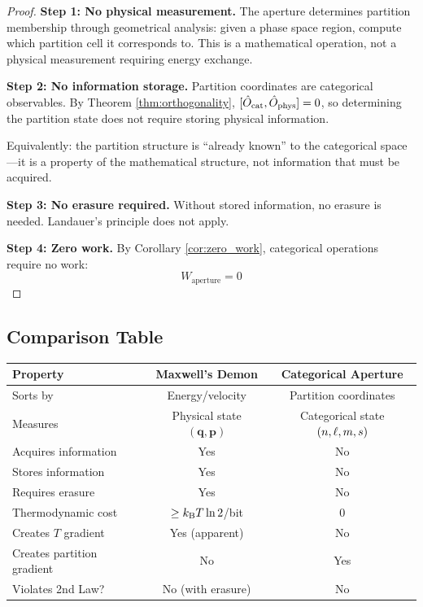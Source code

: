 \begin{proof}
\textbf{Step 1: No physical measurement.}
The aperture determines partition membership through geometrical analysis: given a phase space region, compute which partition cell it corresponds to. This is a mathematical operation, not a physical measurement requiring energy exchange.

\textbf{Step 2: No information storage.}
Partition coordinates are categorical observables. By Theorem \ref{thm:orthogonality}, $[\hat{O}_{\mathrm{cat}}, \hat{O}_{\mathrm{phys}}] = 0$, so determining the partition state does not require storing physical information.

Equivalently: the partition structure is ``already known'' to the categorical space---it is a property of the mathematical structure, not information that must be acquired.

\textbf{Step 3: No erasure required.}
Without stored information, no erasure is needed. Landauer's principle does not apply.

\textbf{Step 4: Zero work.}
By Corollary \ref{cor:zero_work}, categorical operations require no work:
\begin{equation}
W_{\text{aperture}} = 0
\end{equation}
\end{proof}

\subsection{Comparison Table}

\begin{center}
\begin{tabular}{lcc}
\toprule
\textbf{Property} & \textbf{Maxwell's Demon} & \textbf{Categorical Aperture} \\
\midrule
Sorts by & Energy/velocity & Partition coordinates \\
Measures & Physical state $(\mathbf{q}, \mathbf{p})$ & Categorical state $(n,\ell,m,s)$ \\
Acquires information & Yes & No \\
Stores information & Yes & No \\
Requires erasure & Yes & No \\
Thermodynamic cost & $\geq k_{\mathrm{B}} T \ln 2$/bit & 0 \\
Creates $T$ gradient & Yes (apparent) & No \\
Creates partition gradient & No & Yes \\
Violates 2nd Law? & No (with erasure) & No \\
\bottomrule
\end{tabular}
\end{center}

